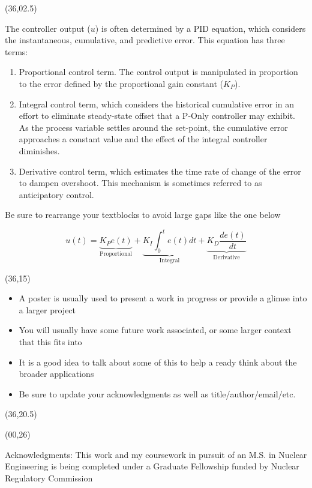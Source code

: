 \documentclass{article}
\def\CHead#1{\begin{center}\noindent{\LARGE\color{DarkBlue} #1}\end{center}}
\renewcommand{\footnotesize}{\fontsize{17.28}{22}\selectfont}
\renewcommand{\LARGE}{\fontsize{43}{54}\selectfont}
\begin{document}
\begin{textblock}{10}(36,02.5)
\CHead{PID Controller}
The controller output ($u$) is often determined by a PID equation, which considers the instantaneous, cumulative, and predictive error. This equation has three terms:
\begin{enumerate}
\item Proportional control term. The control output is manipulated in proportion to the error defined by the proportional gain constant ($K_P$).   
\item Integral control term, which considers the historical cumulative error in an effort to eliminate steady-state offset that a P-Only controller may exhibit. As the process variable settles around the set-point, the cumulative error approaches a constant value and the effect of the integral controller diminishes.
\item Derivative control term, which estimates the time rate of change of the error to dampen overshoot. This mechanism is sometimes referred to as anticipatory control. 
\end{enumerate}

Be sure to rearrange your textblocks to avoid large gaps like the one below


\begin{equation*}\label{eqn:pid}
    u(t) 
    = \underbrace{K_P e(t)}_{\text{Proportional}} 
    + \underbrace{K_I \int_0^t e(t)dt}_{\text{Integral}} 
    + \underbrace{K_D \frac{de(t)}{dt}}_{\text{Derivative}}
\end{equation*}
\end{textblock}


\begin{textblock}{10}(36,15)
\CHead{Future Work}
\begin{itemize}
    \item A poster is usually used to present a work in progress or provide a glimse into a larger project
    \item You will usually have some future work associated, or some larger context that this fits into 
    \item It is a good idea to talk about some of this to help a ready think about the broader applications
    \item Be sure to update your acknowledgments as well as title/author/email/etc. \cite{RootMS}
\end{itemize}



\end{textblock}


\begin{textblock}{10}(36,20.5)
\CHead{References}


\end{textblock}



\begin{textblock}{46}(00,26)
\begin{center}
{\footnotesize Acknowledgments: This work and my coursework in pursuit of an M.S. in Nuclear Engineering is being completed under a Graduate Fellowship funded by Nuclear Regulatory Commission }
\end{center}
\end{textblock}
\end{document}
